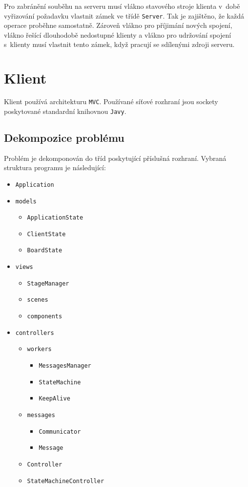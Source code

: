 \documentclass[a4paper, 12pt]{report}
\begin{document}
Pro zabránění souběhu na serveru musí vlákno stavového stroje klienta v~době vyřizování požadavku vlastnit zámek ve třídě \texttt{Server}. Tak je zajištěno, že každá operace proběhne samostatně. Zároveň vlákno pro příjimání nových spojení, vlákno řešící dlouhodobě nedostupné klienty a vlákno pro udržování spojení s~klienty musí vlastnit tento zámek, když pracují se sdílenými zdroji serveru.

\section{Klient}

Klient používá architekturu \texttt{MVC}. Používané síťové rozhraní jsou sockety poskytované standardní knihovnou \texttt{Javy}.

\subsection{Dekompozice problému}

Problém je dekomponován do tříd poskytující příslušná rozhraní. Vybraná struktura programu je následující:

\begin{itemize}
    \item \texttt{Application}
    \item \texttt{models}
    \begin{itemize}
        \item \texttt{ApplicationState}
        \item \texttt{ClientState}
        \item \texttt{BoardState}
    \end{itemize}
    \item \texttt{views}
    \begin{itemize}
        \item \texttt{StageManager}
        \item \texttt{scenes}
        \item \texttt{components}
    \end{itemize}
    \item \texttt{controllers}
    \begin{itemize}
        \item \texttt{workers}
        \begin{itemize}
            \item \texttt{MessagesManager}
            \item \texttt{StateMachine}
            \item \texttt{KeepAlive}
        \end{itemize}
        \item \texttt{messages}
        \begin{itemize}
            \item \texttt{Communicator}
            \item \texttt{Message}
        \end{itemize}
        \item \texttt{Controller}
        \item \texttt{StateMachineController}
    \end{itemize}
\end{itemize}
\end{document}
